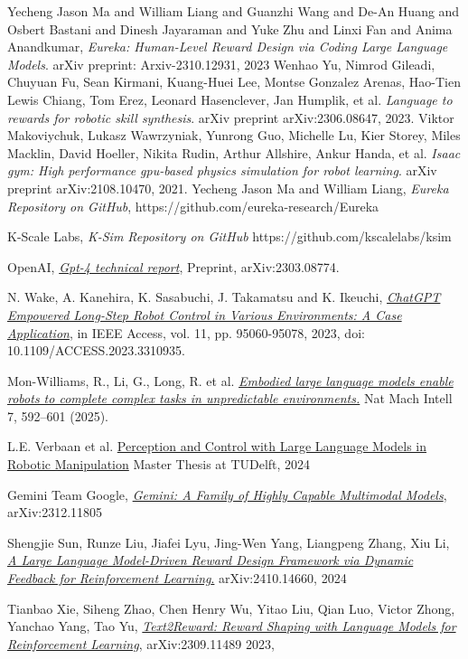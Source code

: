 \documentclass[10pt,twocolumn]{article}
\begin{document}
\begin{thebibliography}{9}
Yecheng Jason Ma and William Liang and Guanzhi Wang and De-An Huang and Osbert Bastani and Dinesh Jayaraman and Yuke Zhu and Linxi Fan and Anima Anandkumar, \emph{Eureka: Human-Level Reward Design via Coding Large Language Models}. arXiv preprint: Arxiv-2310.12931, 2023
Wenhao Yu, Nimrod Gileadi, Chuyuan Fu, Sean Kirmani, Kuang-Huei Lee, Montse Gonzalez Arenas, Hao-Tien Lewis Chiang, Tom Erez, Leonard Hasenclever, Jan Humplik, et al. \emph{Language to rewards for robotic skill synthesis}. arXiv preprint arXiv:2306.08647, 2023.
Viktor Makoviychuk, Lukasz Wawrzyniak, Yunrong Guo, Michelle Lu, Kier Storey, Miles Macklin,
David Hoeller, Nikita Rudin, Arthur Allshire, Ankur Handa, et al. \emph{Isaac gym: High performance
gpu-based physics simulation for robot learning}. arXiv preprint arXiv:2108.10470, 2021.
Yecheng Jason Ma and William Liang, \emph{Eureka Repository on GitHub}, https://github.com/eureka-research/Eureka

K-Scale Labs, \emph{K-Sim Repository on GitHub}
https://github.com/kscalelabs/ksim

OpenAI,
\href{https://arxiv.org/abs/2303.08774}{\emph{Gpt-4 technical report}},
Preprint,
arXiv:2303.08774.

N. Wake, A. Kanehira, K. Sasabuchi, J. Takamatsu and K. Ikeuchi, 
\href{https://ieeexplore.ieee.org/document/10235949}{\emph{ChatGPT Empowered Long-Step Robot Control in Various Environments: A Case Application}},
in IEEE Access, vol. 11, pp. 95060-95078, 2023, 
doi: 10.1109/ACCESS.2023.3310935.

Mon-Williams, R., Li, G., Long, R. et al. 
\href{https://doi.org/10.1038/s42256-025-01005-x}{\emph{Embodied large language models enable robots to complete complex tasks in unpredictable environments.}}
Nat Mach Intell 7, 592–601 (2025). 

L.E. Verbaan et al.
\href{https://repository.tudelft.nl/record/uuid:2944a8e1-0a54-492b-af63-193a7ac11db8#title}{Perception and Control with Large Language Models in Robotic Manipulation}
Master Thesis at TUDelft, 2024

Gemini Team Google,
\href{https://arxiv.org/abs/2312.11805}{\emph{Gemini: A Family of Highly Capable Multimodal Models}},
arXiv:2312.11805

Shengjie Sun, Runze Liu, Jiafei Lyu, Jing-Wen Yang, Liangpeng Zhang, Xiu Li,
\href{https://doi.org/10.48550/arXiv.2410.14660}{\emph{A Large Language Model-Driven Reward Design Framework via Dynamic Feedback for Reinforcement Learning}.}
arXiv:2410.14660, 2024

Tianbao Xie, Siheng Zhao, Chen Henry Wu, Yitao Liu, Qian Luo, Victor Zhong, Yanchao Yang, Tao Yu,
\href{https://doi.org/10.48550/arXiv.2309.11489}{\emph{Text2Reward: Reward Shaping with Language Models for Reinforcement Learning}},
arXiv:2309.11489 2023,

\end{thebibliography}
\end{document}
